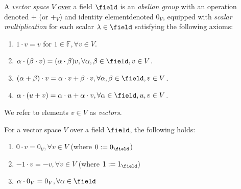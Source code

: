 
\begin{definition}
    A \emph{vector space} $V$ \underline{over} a field $\field$ is an \emph{abelian group} with an operation denoted $+$ (or $+_V$) and identity element\footnotemark denoted $0_V$, equipped with \emph{scalar multiplication} for each scalar $\lambda \in \field$ satisfying the following axioms:
    \begin{enumerate}
        \item $1 \cdot v = v$ for $1 \in \mathbb{F}, \forall v \in V$.
        \item $\alpha\cdot(\beta \cdot v) = (\alpha \cdot \beta)v, \forall \alpha, \beta \in \field, v \in V$.
        \item $(\alpha + \beta) \cdot v = \alpha \cdot v + \beta \cdot v, \forall \alpha, \beta \in \field, v \in V$.
        \item $\alpha \cdot (u + v) = \alpha \cdot u + \alpha \cdot v, \forall \alpha \in \field, u, v \in V$.
    \end{enumerate}
    We refer to elements $v \in V$ as \emph{vectors}.
\end{definition}

\begin{proposition}
    For a vector space $V$ over a field $\field$, the following holds:
    \begin{enumerate}
        \item $0 \cdot v = 0_V, \forall v \in V$ (where $0:=0_\field$)
        \item $-1 \cdot v = -v, \forall v \in V$ (where $1:=1_\field$)\footnotemark
        \item $\alpha \cdot 0_V = 0_V, \forall \alpha \in \field$
    \end{enumerate}
\end{proposition}


